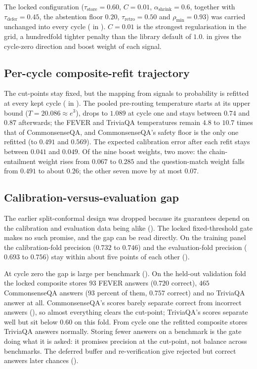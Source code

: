 The locked configuration ($\tau_{\text{store}} = 0.60$, $C = 0.01$, $\alpha_{\text{shrink}} = 0.6$, together with $\tau_{\text{defer}} = 0.45$, the abstention floor $0.20$, $\tau_{\text{retro}} = 0.50$ and $\rho_{\min} = 0.93$) was carried unchanged into every cycle ( in ). $C = 0.01$ is the strongest regularisation in the grid, a hundredfold tighter penalty than the library default of $1.0$.  in  gives the cycle-zero direction and boost weight of each signal.

\subsection{Per-cycle composite-refit trajectory}
\label{sec:adj-trajectory}

The cut-points stay fixed, but the mapping from signals to probability is refitted at every kept cycle ( in ). The pooled pre-routing temperature starts at its upper bound ($T = 20.086 \approx e^{3}$), drops to $1.089$ at cycle one and stays between $0.74$ and $0.87$ afterwards; the FEVER and TriviaQA temperatures remain $4.8$ to $10.7$ times that of CommonsenseQA, and CommonsenseQA's safety floor is the only one refitted (to $0.491$ and $0.569$). The expected calibration error after each refit stays between $0.041$ and $0.049$. Of the nine boost weights, two move: the chain-entailment weight rises from $0.067$ to $0.285$ and the question-match weight falls from $0.491$ to about $0.26$; the other seven move by at most $0.07$.

\FloatBarrier

\subsection{Calibration-versus-evaluation gap}
\label{sec:adj-cal-eval-gap}

The earlier split-conformal design was dropped because its guarantees depend on the calibration and evaluation data being alike (). The locked fixed-threshold gate makes no such promise, and the gap can be read directly. On the training panel the calibration-fold precision ($0.732$ to $0.746$) and the evaluation-fold precision ($0.693$ to $0.756$) stay within about five points of each other ().

At cycle zero the gap is large per benchmark (). On the held-out validation fold the locked composite stores $93$ FEVER answers ($0.720$ correct), $465$ CommonsenseQA answers ($93$ percent of them, $0.757$ correct) and no TriviaQA answer at all. CommonsenseQA's scores barely separate correct from incorrect answers (), so almost everything clears the cut-point; TriviaQA's scores separate well but sit below $0.60$ on this fold. From cycle one the refitted composite stores TriviaQA answers normally. Storing fewer answers on a benchmark is the gate doing what it is asked: it promises precision at the cut-point, not balance across benchmarks. The deferred buffer and re-verification give rejected but correct answers later chances ().


